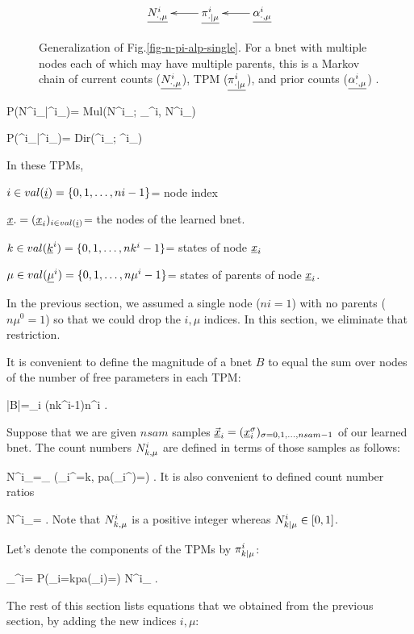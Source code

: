 \begin{figure}[h!]
$$
\xymatrix{
\ul{N^i_\dotmu}
&\ul{\pi^i_\dotbarmu}\ar[l]
&
\ul{\alp^i_\dotmu}\ar[l]
}$$
\caption{
Generalization
of Fig.\ref{fig-n-pi-alp-single}.
For a bnet with multiple nodes
each of which may have multiple parents,
this is  a
Markov chain of
current counts ($\ul{N^i_\dotmu}$),
TPM ($\ul{\pi^i_\dotbarmu}$),
and
prior counts ($\ul{\alp^i_\dotmu}$)
.}
\label{fig-n-pi-alp-many}
\end{figure}

\beq\color{blue}
P(N^i_\dotmu|\pi^i_\dotbarmu)=
Mul(N^i_\dotmu;
\pi_\dotbarmu^i, N^i_\plusmu)
\eeq

\beq\color{blue}
P(\pi^i_\dotbarmu|\alp^i_\dotmu)=
Dir(\pi^i_\dotbarmu; \alp^i_\dotmu)
\eeq

In these TPMs,

$i\in
val(\rvi)=\{0, 1, \dots, ni-1\}$= node index

$\rvx.=(\rvx_i)_{i\in val(\rvi)}$= the
nodes of the learned bnet.

$k\in
val(\rvk^i)=\{0, 1, \dots, nk^i-1\}$= states
of node $\rvx_i$

$\mu\in
val(\ul{\mu}^i)=\{0, 1, \dots, n\mu^i-1\}$=
states of parents of node $\rvx_i$.

In the previous section,
we assumed a single node ($ni=1$)
with no parents ($n\mu^0=1$)
so that 
we could drop  the $i, \mu$
indices.
In this section, we eliminate
that restriction.


It is 
convenient
to define the magnitude of a  bnet
 $B$
to equal the sum
over nodes of the number 
of free parameters in each TPM:

\beq
|B|=\sum_i
(nk^i-1)n\mu^i
\;.
\eeq

Suppose that 
we are given $nsam$ samples 
$
\vec{\rvx}_i=
(\rvx_i^\s)_
{\sigma=0, 1, \ldots, nsam-1}
$ of 
our learned bnet. The count numbers
$N^i_{k,\mu}$ are defined 
in terms of those samples 
as follows:
 

\beq
N^i_\kmu=\sum_\sigma
\indi(\rvx_i^\s=k, pa(\rvx_i^\s)=\mu )
\;.
\eeq
It is also convenient
to
defined
count number ratios

\beq
N^i_\kbarmu=
\;.
\eeq
Note that
$N^i_{k,\mu}$
is a positive integer whereas
$N^i_{k|\mu}\in[0,1]$.

Let's denote
the components of the TPMs by
$\pi^i_{k|\mu}$:


\beq
\pi_\kbarmu^i=
P(\rvx_i=k\mid pa(\rvx_i)=\mu )
\approx
N^i_\kbarmu
\;.
\eeq


The rest
of this section
lists equations that
we obtained 
from the previous
section, by adding the new indices
$i, \mu$:

